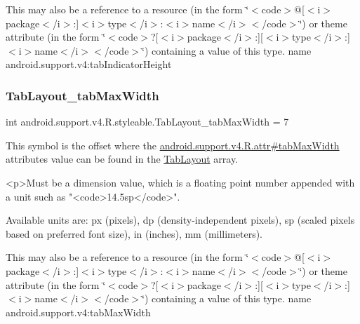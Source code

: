 This may also be a reference to a resource (in the form \char`\"{}$<$code$>$@\mbox{[}$<$i$>$package$<$/i$>$\+:\mbox{]}$<$i$>$type$<$/i$>$\+:$<$i$>$name$<$/i$>$$<$/code$>$\char`\"{}) or theme attribute (in the form \char`\"{}$<$code$>$?\mbox{[}$<$i$>$package$<$/i$>$\+:\mbox{]}\mbox{[}$<$i$>$type$<$/i$>$\+:\mbox{]}$<$i$>$name$<$/i$>$$<$/code$>$\char`\"{}) containing a value of this type.  name android.\+support.\+v4\+:tab\+Indicator\+Height \mbox{\label{classandroid_1_1support_1_1v4_1_1R_1_1styleable_af92579e4d7a148e6a6da15e69617009b}} 
\subsubsection{\texorpdfstring{Tab\+Layout\+\_\+tab\+Max\+Width}{TabLayout\_tabMaxWidth}}
{\footnotesize\ttfamily int android.\+support.\+v4.\+R.\+styleable.\+Tab\+Layout\+\_\+tab\+Max\+Width = 7\hspace{0.3cm}{\ttfamily [static]}}

This symbol is the offset where the \hyperlink{classandroid_1_1support_1_1v4_1_1R_1_1attr_a926a07daeb0c2ad7c63bcf15ce23fc3c}{android.\+support.\+v4.\+R.\+attr\#tab\+Max\+Width} attribute\textquotesingle{}s value can be found in the \hyperlink{classandroid_1_1support_1_1v4_1_1R_1_1styleable_a48e866d7121b40ef0bb3d467759606a9}{Tab\+Layout} array.

\begin{DoxyVerb}      <p>Must be a dimension value, which is a floating point number appended with a unit such as "<code>14.5sp</code>".
\end{DoxyVerb}
 Available units are\+: px (pixels), dp (density-\/independent pixels), sp (scaled pixels based on preferred font size), in (inches), mm (millimeters). 

This may also be a reference to a resource (in the form \char`\"{}$<$code$>$@\mbox{[}$<$i$>$package$<$/i$>$\+:\mbox{]}$<$i$>$type$<$/i$>$\+:$<$i$>$name$<$/i$>$$<$/code$>$\char`\"{}) or theme attribute (in the form \char`\"{}$<$code$>$?\mbox{[}$<$i$>$package$<$/i$>$\+:\mbox{]}\mbox{[}$<$i$>$type$<$/i$>$\+:\mbox{]}$<$i$>$name$<$/i$>$$<$/code$>$\char`\"{}) containing a value of this type.  name android.\+support.\+v4\+:tab\+Max\+Width \mbox{\label{classandroid_1_1support_1_1v4_1_1R_1_1styleable_aea0e67b08f61fea507155aa4237dcd59}} 
